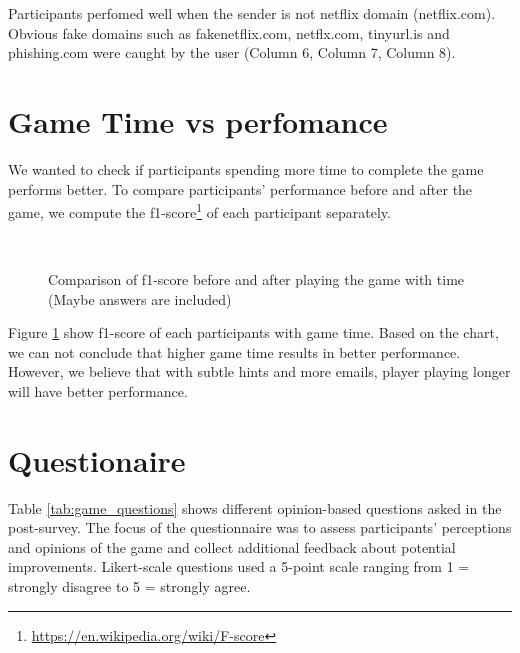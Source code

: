Participants perfomed well when the sender is not netflix domain (netflix.com). Obvious fake domains such as fakenetflix.com, netflx.com, tinyurl.is and phishing.com were caught by the user (Column 6, Column 7, Column 8).

\section{Game Time vs perfomance}
We wanted to check if participants spending more time to complete the game performs better. To compare participants' performance before and after the game, we compute the f1-score\footnote{\url{https://en.wikipedia.org/wiki/F-score}} of each participant separately.

\begin{figure}[!ht]
    \begin{center}

         \\
        \hfill
        \hfill
        \caption{Comparison of f1-score before and after playing the game with time (Maybe answers are included)}
        \label{fig:f1_with_time}
    \end{center}

\end{figure}


Figure \ref{fig:f1_with_time} show f1-score of each participants with game time. Based on the chart, we can not conclude that higher game time results in better performance. However, we believe that with subtle hints and more emails, player playing longer will have better performance.

\section{Questionaire}
Table \ref{tab:game_questions} shows different opinion-based questions asked in the post-survey. The focus of the questionnaire was to assess participants' perceptions and opinions of the game and collect additional feedback about potential improvements.  Likert-scale questions used a 5-point scale ranging from 1 = strongly disagree to 5 = strongly agree.

